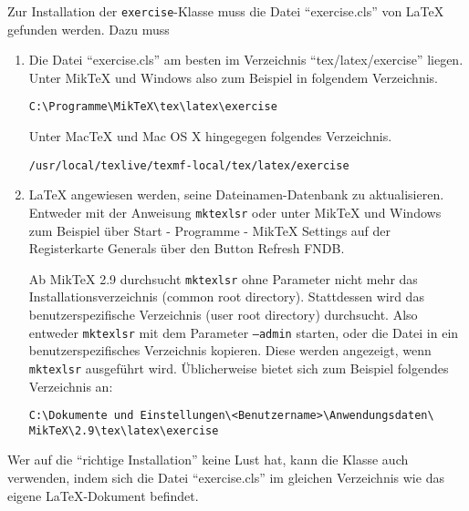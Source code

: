 \documentclass{exercise}
\begin{document}
    Zur Installation der \texttt{exercise}-Klasse muss die Datei
    \enquote{exercise.cls} von \LaTeX{} gefunden werden. Dazu muss
    \begin{enumerate}[1)]
      \item Die Datei \enquote{exercise.cls} am besten im Verzeichnis
        \enquote{tex/latex/exercise}
        liegen. Unter MikTeX und Windows also zum Beispiel in folgendem Verzeichnis.
        
        \texttt{C:\textbackslash{}Programme\textbackslash{}MikTeX\textbackslash{}tex\textbackslash{}latex\textbackslash{}exercise}

        Unter MacTeX und Mac OS X hingegegen folgendes Verzeichnis.

        \texttt{/usr/local/texlive/texmf-local/tex/latex/exercise}
      
      \item \LaTeX{} angewiesen werden, seine Dateinamen-Datenbank zu aktualisieren.
        Entweder mit der Anweisung \texttt{mktexlsr} oder unter MikTeX und Windows
        zum Beispiel über \textsf{Start - Programme - MikTeX Settings} auf der
        Registerkarte \textsf{Generals} über den Button \textsf{Refresh FNDB}.
        
      Ab MikTeX 2.9 durchsucht \texttt{mktexlsr} ohne Parameter nicht mehr das
      Installationsverzeichnis (common root directory). Stattdessen wird
      das benutzerspezifische Verzeichnis (user root directory) durchsucht. Also
      entweder \texttt{mktexlsr} mit dem Parameter \texttt{--admin} starten,
      oder die Datei in ein benutzerspezifisches Verzeichnis kopieren. Diese
      werden angezeigt, wenn \texttt{mktexlsr} ausgeführt wird. Üblicherweise
      bietet sich zum Beispiel folgendes Verzeichnis an:
      
      \texttt{C:\textbackslash{}Dokumente und Einstellungen\textbackslash{}<Benutzername>\textbackslash{}Anwendungsdaten\textbackslash{}\\
      MikTeX\textbackslash{}2.9\textbackslash{}tex\textbackslash{}latex\textbackslash{}exercise}
       
    \end{enumerate}
    
    Wer auf die \enquote{richtige Installation} keine Lust hat, kann die Klasse
    auch verwenden, indem sich die Datei \enquote{exercise.cls} im gleichen
    Verzeichnis wie das eigene \LaTeX{}-Dokument befindet.
    
\end{document}
